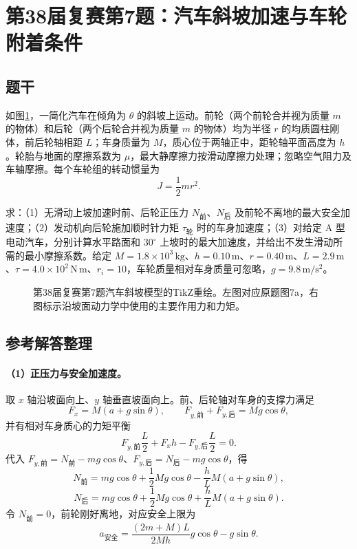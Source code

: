 \section{第38届复赛第7题：汽车斜坡加速与车轮附着条件}

\subsection{题干}
如图\ref{fig:cpho38q07}，一简化汽车在倾角为 $\theta$ 的斜坡上运动。前轮（两个前轮合并视为质量 $m$ 的物体）和后轮（两个后轮合并视为质量 $m$ 的物体）均为半径 $r$ 的均质圆柱刚体，前后轮轴相距 $L$；车身质量为 $M$，质心位于两轴正中，距轮轴平面高度为 $h$。轮胎与地面的摩擦系数为 $\mu$，最大静摩擦力按滑动摩擦力处理；忽略空气阻力及车轴摩擦。每个车轮组的转动惯量为
\[
J=\frac12mr^2.
\]

求：（1）无滑动上坡加速时前、后轮正压力 $N_{\text{前}}$、$N_{\text{后}}$ 及前轮不离地的最大安全加速度；（2）发动机向后轮施加顺时针力矩 $\tau_{\text{轮}}$ 时的车身加速度；（3）对给定 A 型电动汽车，分别计算水平路面和 $30^\circ$ 上坡时的最大加速度，并给出不发生滑动所需的最小摩擦系数。给定 $M=1.8\times10^3\,\mathrm{kg}$、$h=0.10\,\mathrm m$、$r=0.40\,\mathrm m$、$L=2.9\,\mathrm m$、$\tau=4.0\times10^2\,\mathrm{N\,m}$、$r_i=10$，车轮质量相对车身质量可忽略，$g=9.8\,\mathrm{m/s^2}$。

\begin{figure}[htbp]
  \centering
  
  \caption{第38届复赛第7题汽车斜坡模型的TikZ重绘。左图对应原题图7a，右图标示沿坡面动力学中使用的主要作用力和力矩。}
  \label{fig:cpho38q07}
\end{figure}

\subsection{参考解答整理}
\paragraph{（1）正压力与安全加速度。}
取 $x$ 轴沿坡面向上、$y$ 轴垂直坡面向上。前、后轮轴对车身的支撑力满足
\[
F_{x}=M(a+g\sin\theta),\qquad
F_{y,\text{前}}+F_{y,\text{后}}=Mg\cos\theta,
\]
并有相对车身质心的力矩平衡
\[
F_{y,\text{前}}\frac L2+F_xh-F_{y,\text{后}}\frac L2=0.
\]
代入 $F_{y,\text{前}}=N_{\text{前}}-mg\cos\theta$、$F_{y,\text{后}}=N_{\text{后}}-mg\cos\theta$，得
\[
\boxed{N_{\text{前}}=mg\cos\theta+\frac12Mg\cos\theta
-\frac hL M(a+g\sin\theta),}
\]
\[
\boxed{N_{\text{后}}=mg\cos\theta+\frac12Mg\cos\theta
+\frac hL M(a+g\sin\theta).}
\]
令 $N_{\text{前}}=0$，前轮刚好离地，对应安全上限为
\[
\boxed{a_{\text{安全}}=
\frac{(2m+M)L}{2Mh}g\cos\theta-g\sin\theta.}
\]

